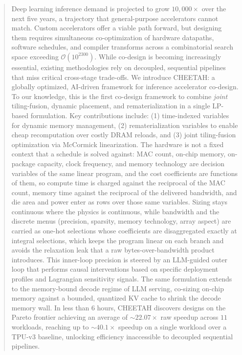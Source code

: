 \begin{abstract}
Deep learning inference demand is projected to grow $10{,}000\times$ over the next five years, a trajectory that general-purpose accelerators cannot match. Custom accelerators offer a viable path forward, but designing them requires simultaneous co-optimization of hardware datapaths, software schedules, and compiler transforms across a combinatorial search space exceeding $\mathcal O(10^{2300})$. While co-design is becoming increasingly essential, existing methodologies rely on decoupled, sequential pipelines that miss critical cross-stage trade-offs. We introduce \textsc{CHEETAH}: a globally optimized, AI-driven framework for inference accelerator co-design. 
To our knowledge, this is the first co-design framework to combine \textit{joint} tiling-fusion, dynamic placement, and rematerialization in a single LP-based formulation.
Key contributions include: (1) time-indexed variables for dynamic memory management, (2) rematerialization variables to enable cheap recomputation over costly DRAM reloads, and (3) joint tiling-fusion optimization via McCormick linearization. The hardware is not a fixed context that a schedule is solved against: MAC count, on-chip memory, on-package capacity, clock frequency, and memory technology are decision variables of the same linear program, and the cost coefficients are functions of them, so compute time is charged against the reciprocal of the MAC count, memory time against the reciprocal of the delivered bandwidth, and die area and power enter as rows over those same variables. Sizing stays continuous where the physics is continuous, while bandwidth and the discrete menus (precision, sparsity, memory technology, array aspect) are carried as one-hot selections whose coefficients are disaggregated exactly at integral selections, which keeps the program linear on each branch and avoids the relaxation leak that a raw bytes-over-bandwidth product introduces. This inner-loop precision is steered by an LLM-guided outer loop that performs causal interventions based on specific deployment profiles and Lagrangian sensitivity signals. The same formulation extends to the memory-bound decode regime of LLM serving, co-sizing on-chip memory against a bounded, quantized KV cache to shrink the decode memory wall. In less than 6 hours, \textsc{CHEETAH} discovers designs on the Pareto frontier achieving an average of $\sim22.07\times$ raw speedup across $11$ workloads, reaching up to $\sim40.1\times$ speedup on a single workload over a TPU-v3 baseline, unlocking efficiency inaccessible to decoupled sequential pipelines.\end{abstract}

